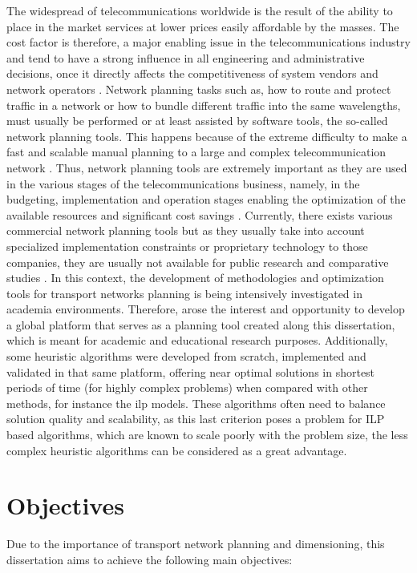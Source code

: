 The widespread of telecommunications worldwide is the result of the ability to place in the market services at lower prices easily affordable by the masses. The cost factor is therefore, a major enabling issue in the telecommunications industry and tend to have a strong influence in all engineering and administrative decisions, once it directly affects the competitiveness of system vendors and network operators \cite{anpinto}. Network planning tasks such as, how to route and protect traffic in a network or how to bundle different traffic into the same wavelengths, must usually be performed or at least assisted by software tools, the so-called network planning tools. This happens because of the extreme difficulty to make a fast and scalable manual planning to a large and complex telecommunication network \cite{SimmonsJane2008}. Thus, network planning tools are extremely important as they are used in the various stages of the telecommunications business, namely, in the budgeting, implementation and operation stages enabling the optimization of the available resources and significant cost savings \cite{RuiMoraisPhD}. Currently, there exists various commercial network planning tools but as they usually take into account specialized implementation constraints or proprietary technology to those companies, they are usually not available for public research and comparative studies \cite{7193723}. In this context, the development of methodologies and optimization tools for transport networks planning is being intensively investigated in academia environments. Therefore, arose the interest and opportunity to develop a global platform that serves as a planning tool created along this dissertation, which is meant for academic and educational research purposes. Additionally, some heuristic algorithms were developed from scratch, implemented and validated in that same platform, offering near optimal solutions in shortest periods of time (for highly complex problems) when compared with other methods, for instance the \gls{ilp} models. These algorithms often need to balance solution quality and scalability, as this last criterion poses a problem for ILP based algorithms, which are known to scale poorly with the problem size, the less complex heuristic algorithms can be considered as a great advantage.

\section{Objectives}
\label{objectives}
Due to the importance of transport network planning and dimensioning, this dissertation aims to achieve the following main objectives:

